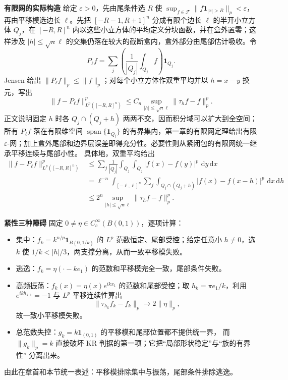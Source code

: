 \documentclass[11pt,a4paper]{ctexart}
\newcommand{\eps}{\varepsilon}
\newcommand{\dd}{\,\mathrm d}
\newcommand{\planitem}[1]{\par\smallskip\noindent\textcolor{deepblue}{\textbf{#1}}\quad}
\begin{document}
\planitem{有限网的实际构造}
给定 $\eps>0$，先由尾条件选 $R$ 使
$\sup_{f\in\mathcal F}\|f\mathbf1_{|x|>R}\|_p<\eps$，再由平移模选边长 $\ell$。先把
 $[-R-1,R+1]^n$ 分成有限个边长 $\ell$ 的半开小立方体 $Q_j$，在
 $[-R,R]^n$ 内以这些小立方体的平均定义分块函数，并在盒外置零；这样涉及
 $|h|\le\sqrt n\ell$ 的交集仍落在较大的截断盒内，盒外部分由尾部估计吸收。令
\[
 P_\ell f=\sum_j\left(\frac1{|Q_j|}\int_{Q_j}f\right)\mathbf1_{Q_j}.
\]
Jensen 给出 $\|P_\ell f\|_p\le\|f\|_p$；对每个小立方体作双重平均并以
$h=x-y$ 换元，写出
\[
 \|f-P_\ell f\|_{L^p([-R,R]^n)}^p
 \le C_n\sup_{|h|\le\sqrt n\ell}\|\tau_hf-f\|_p^p.
\]
正文说明固定 $h$ 时各 $Q_j\cap(Q_j+h)$ 两两不交，因而积分域可以扩大到全空间；所有 $P_\ell f$ 落在有限维空间 $\operatorname{span}\{\mathbf1_{Q_j}\}$ 的有界集内，第一章的有限网定理给出有限 $\eps$-网；加上盒外尾部和边界层误差即得充分性。必要性则从紧闭包的有限网统一继承平移连续与尾部小性。
具体地，双重平均给出
\[
\begin{aligned}
 \|f-P_\ell f\|_{L^p([-R,R]^n)}^p
 &\le \sum_j\frac1{|Q_j|}\int_{Q_j}\int_{Q_j}|f(x)-f(y)|^p\,\dd y\dd x\\
 &=\ell^{-n}\int_{[-\ell,\ell]^n}
 \sum_j\int_{Q_j\cap(Q_j+h)}|f(x)-f(x-h)|^p\,\dd x\dd h\\
 &\le 2^n\sup_{|h|\le\sqrt n\ell}\|\tau_hf-f\|_p^p .
\end{aligned}
\]

\planitem{紧性三种障碍}
固定 $0\ne\eta\in C_c^\infty(B(0,1))$，逐项计算：
\begin{itemize}
\item 集中：$f_k=k^{n/p}\mathbf1_{B(0,1/k)}$ 的 $L^p$ 范数恒定、尾部受控；给定任意小 $h\ne0$，选 $k$ 使 $1/k<|h|/3$，两支撑分离，从而一致平移模失败。
\item 逃逸：$f_k=\eta(\cdot-ke_1)$ 的范数和平移模完全一致，尾部条件失败。
\item 高频振荡：$f_k(x)=\eta(x)e^{ikx_1}$ 的范数和尾部受控；取
$h_k=\pi e_1/k$，利用 $e^{ik h_{k,1}}=-1$ 与 $L^p$ 平移连续性算出
\[
\|\tau_{h_k}f_k-f_k\|_p\longrightarrow2\|\eta\|_p,
\]
故一致小平移模失败。
\item 总范数失控：$g_k=k\mathbf1_{(0,1)}$ 的平移模和尾部位置都不提供统一界，
而 $\|g_k\|_p=k$ 直接破坏 KR 判据的第一项；它把“局部形状稳定”与“族的有界性”
分离出来。
\end{itemize}
由此在章首和本节统一表述：平移模排除集中与振荡，尾部条件排除逃逸。
\end{document}
